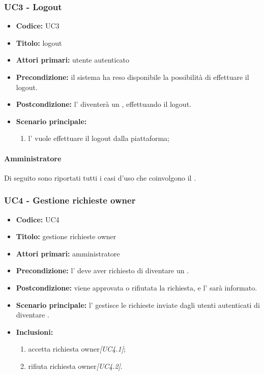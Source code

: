 \documentclass[casi-duso]{subfiles}
\begin{document}
\subsubsection{UC3 - Logout}
\label{subsub:UC3}
\begin{itemize}
  \item \textbf{Codice:} UC3
  \item \textbf{Titolo:} logout
  \item \textbf{Attori primari:} utente autenticato
  \item \textbf{Precondizione:} il sistema ha reso disponibile la possibilità di effettuare il logout.
  \item \textbf{Postcondizione:} l' diventerà un , effettuando il logout.
  \item \textbf{Scenario principale:} 
  \begin{enumerate}
    \item l' vuole effettuare il logout dalla piattaforma;
  \end{enumerate}
\end{itemize}

\paragraph{Amministratore}
\label{par:amministratore}
Di seguito sono riportati tutti i casi d'uso che coinvolgono il  .


\subsubsection{UC4 - Gestione richieste owner}
\label{subsub:UC4}
\begin{itemize}
  \item \textbf{Codice:} UC4
  \item \textbf{Titolo:} gestione richieste owner
  \item \textbf{Attori primari:} amministratore
  \item \textbf{Precondizione:} l' deve aver richiesto di diventare un .
  \item \textbf{Postcondizione:} viene approvata o rifiutata la richiesta, e l' sarà informato.
  \item \textbf{Scenario principale:} l' gestisce le richieste inviate dagli utenti autenticati di diventare .
  \item \textbf{Inclusioni:}
  \begin{enumerate}
    \item accetta richiesta owner\emph{[UC4.1]};
    \item rifiuta richiesta owner\emph{[UC4.2]}.
  \end{enumerate}
\end{itemize}
\end{document}
